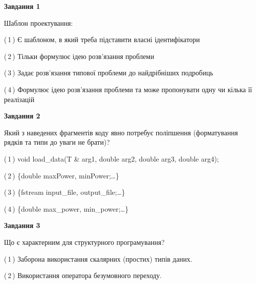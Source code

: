 \documentclass[10pt, ukrainian]{article}
\begin{document}
{
\begin {large}
{\begin {center}\textbf{Завдання 1}\end {center}}\par
Шаблон проектування:\par
\vspace{2mm}



(\,1\,) Є шаблоном, в який треба підставити власні ідентифікатори%



(\,2\,) Тільки формулює ідею розв'язання проблеми%



(\,3\,) Задає розв'язання типової проблеми до найдрібніших подробиць%



(\,4\,) Формулює ідею розв'язання проблеми та може пропонувати одну чи кілька її реалізацій%


{\begin {center}\textbf{Завдання 2}\end {center}}\par
Який з наведених фрагментів коду явно потребує поліпшення (форматування рядків та типи до уваги не брати)?\par
\vspace{2mm}



(\,1\,) void load\_data(T \& arg1, double arg2, double arg3, double arg4); %



(\,2\,) \{double maxPower, minPower;…\} %



(\,3\,) \{fstream input\_file, output\_file;…\} %



(\,4\,) \{double max\_power, min\_power;…\} %


{\begin {center}\textbf{Завдання 3}\end {center}}\par
Що є характерним для структурного програмування?\par
\vspace{2mm}



(\,1\,) Заборона використання скалярних (простих) типів даних. %



(\,2\,) Використання оператора безумовного переходу. %




\end{large}}
\end{document}
